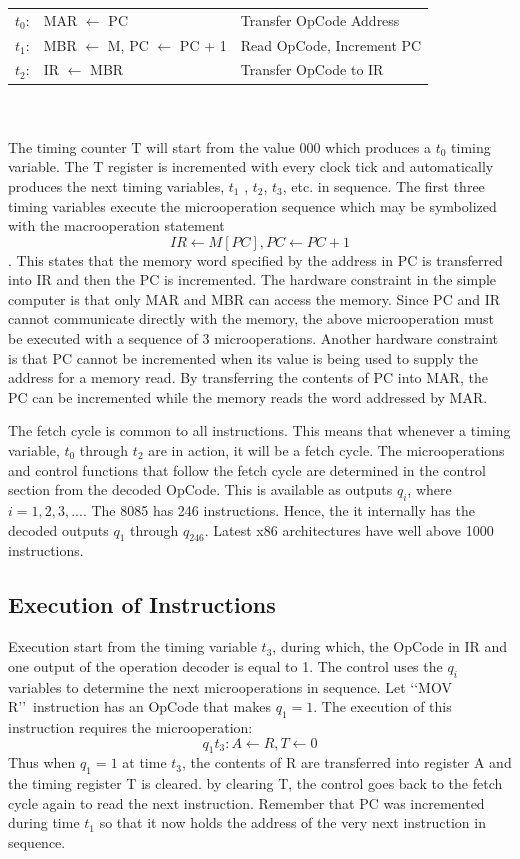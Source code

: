 \documentclass{book}
\begin{document}
\begin{tabular}{r l l}
$t_0$: & MAR $\leftarrow$ PC & Transfer OpCode Address \\
$t_1$: & MBR $\leftarrow$ M, PC $\leftarrow$ PC + 1 & Read OpCode, Increment PC\\
$t_2$: & IR $\leftarrow$ MBR & Transfer OpCode to IR\\
\end{tabular}
\\
\\
The timing counter T will start from the value 000 which produces a $t_0$ timing variable. The T register is incremented with every clock tick and automatically produces the next timing variables, $t_1$ , $t_2$, $t_3$, etc. in sequence. The first three timing variables execute the microoperation sequence which may be symbolized with the macrooperation statement $$ IR \leftarrow M[PC], PC \leftarrow PC + 1$$. This states that the memory word specified by the address in PC is transferred into IR and then the PC is incremented. The hardware constraint in the simple computer is that only MAR and MBR can access the memory. Since PC and IR cannot communicate directly with the memory, the above microoperation must be executed with a sequence of 3 microoperations. Another hardware constraint is that PC cannot be incremented when its value is being used to supply the address for a memory read. By transferring the contents of PC into MAR, the PC can be incremented while the memory reads the word addressed by MAR.

The fetch cycle is common to all instructions. This means that whenever a timing variable, $t_0$ through $t_2$ are in action, it will be a fetch cycle. The microoperations and control functions that follow the fetch cycle are determined in the control section from the decoded OpCode. This is available as outputs $q_i$, where $i = 1, 2, 3,...$. The 8085 has 246 instructions. Hence, the it internally has the decoded outputs $q_1$ through $q_{246}$. Latest x86 architectures have well above 1000 instructions.

\subsection{Execution of Instructions}

Execution start from the timing variable $t_3$, during which, the OpCode in IR and one output of the operation decoder is equal to 1. The control uses the $q_i$ variables to determine the next microoperations in sequence. Let \lq\lq MOV R\rq\rq\ instruction has an OpCode that makes $q_1 = 1$. The execution of this instruction requires the microoperation: $$q_1t_3:  A \leftarrow R, T \leftarrow 0$$
Thus when $q_1 = 1$ at time $t_3$, the contents of R are transferred into register A and the timing register T is cleared. by clearing T, the control goes back to the fetch cycle again to read the next instruction. Remember that PC was incremented during time $t_1$ so that it now holds the address of the very next instruction in sequence.
\end{document}
